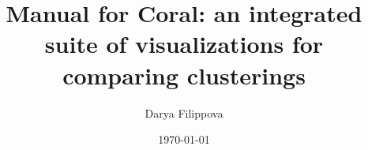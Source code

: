 \documentclass{article}
\newcommand{\coral}{\textcolor{RedOrange}{\textbf{C}}oral\xspace}
\begin{document}
\title{Manual for \coral: an integrated suite of visualizations for comparing clusterings}
\date{\today}
\author{Darya Filippova}

\maketitle

\tableofcontents

\newpage


%



\end{document}
